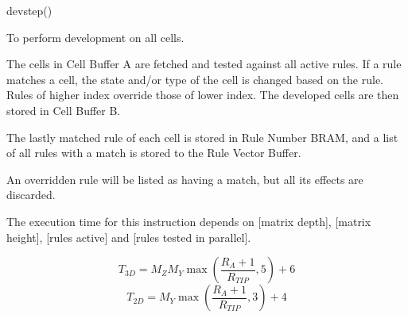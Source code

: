 

\format

devstep()

\purpose

To perform development on all cells.

\description

The cells in Cell Buffer A are fetched and tested against all active rules.
If a rule matches a cell, the state and/or type of the cell is changed based on the rule.
Rules of higher index override those of lower index.
The developed cells are then stored in Cell Buffer B.

The lastly matched rule of each cell is stored in Rule Number BRAM, and a list of all rules with a match is stored to the Rule Vector Buffer.

\notes

An overridden rule will be listed as having a match, but all its effects are discarded.

The execution time for this instruction depends on [matrix depth], [matrix height], [rules active] and [rules tested in parallel].

$$ T_{3D} = M_Z M_Y \max \left( \frac{ R_A + 1 }{ R_{TIP} }, 5 \right) + 6 $$
$$ T_{2D} = M_Y \max \left( \frac{ R_A + 1 }{ R_{TIP} }, 3 \right) + 4 $$
